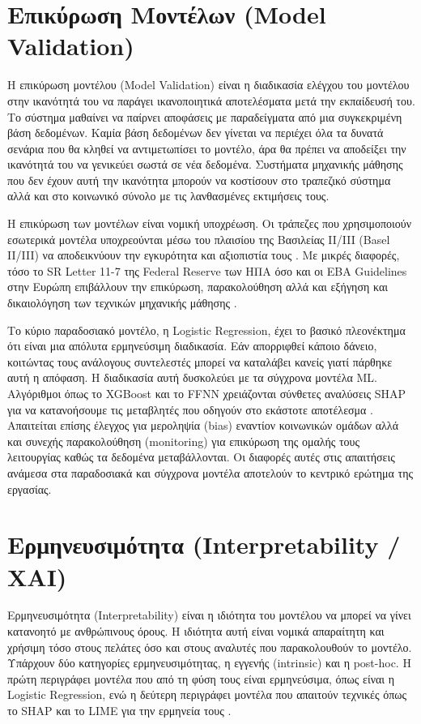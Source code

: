 \section{Επικύρωση Μοντέλων (Model Validation)}
\label{sec:model_validation}

Η επικύρωση μοντέλου (Model Validation) είναι η διαδικασία ελέγχου
του μοντέλου στην ικανότητά του να παράγει ικανοποιητικά αποτελέσματα
μετά την εκπαίδευσή του. Το σύστημα μαθαίνει να παίρνει αποφάσεις με
παραδείγματα από μια συγκεκριμένη βάση δεδομένων. Καμία βάση δεδομένων
δεν γίνεται να περιέχει όλα τα δυνατά σενάρια που θα κληθεί να
αντιμετωπίσει το μοντέλο, άρα θα πρέπει να αποδείξει την ικανότητά
του να γενικεύει σωστά σε νέα δεδομένα. Συστήματα μηχανικής μάθησης
που δεν έχουν αυτή την ικανότητα μπορούν να κοστίσουν στο τραπεζικό
σύστημα αλλά και στο κοινωνικό σύνολο με τις λανθασμένες εκτιμήσεις
τους.

Η επικύρωση των μοντέλων είναι νομική υποχρέωση. Οι τράπεζες που
χρησιμοποιούν εσωτερικά μοντέλα υποχρεούνται μέσω του πλαισίου της
Βασιλείας II/III (Basel II/III) να αποδεικνύουν την εγκυρότητα και
αξιοπιστία τους \citep{basel2006, basel2017}. Με μικρές διαφορές,
τόσο το SR Letter 11-7 της Federal Reserve των ΗΠΑ όσο και οι EBA
Guidelines στην Ευρώπη επιβάλλουν την επικύρωση, παρακολούθηση αλλά
και εξήγηση και δικαιολόγηση των τεχνικών μηχανικής μάθησης
\citep{sr117, eba2023}.

Το κύριο παραδοσιακό μοντέλο, η Logistic Regression, έχει το βασικό
πλεονέκτημα ότι είναι μια απόλυτα ερμηνεύσιμη διαδικασία. Εάν
απορριφθεί κάποιο δάνειο, κοιτώντας τους ανάλογους συντελεστές
μπορεί να καταλάβει κανείς γιατί πάρθηκε αυτή η απόφαση. Η διαδικασία
αυτή δυσκολεύει με τα σύγχρονα μοντέλα ML. Αλγόριθμοι όπως το XGBoost
και το FFNN χρειάζονται σύνθετες αναλύσεις SHAP για να κατανοήσουμε
τις μεταβλητές που οδηγούν στο εκάστοτε αποτέλεσμα \citep{lundberg2017shap}.
Απαιτείται επίσης έλεγχος για μεροληψία (bias) εναντίον κοινωνικών
ομάδων αλλά και συνεχής παρακολούθηση (monitoring) για επικύρωση της
ομαλής τους λειτουργίας καθώς τα δεδομένα μεταβάλλονται. Οι διαφορές
αυτές στις απαιτήσεις ανάμεσα στα παραδοσιακά και σύγχρονα μοντέλα
αποτελούν το κεντρικό ερώτημα της εργασίας.

\section{Ερμηνευσιμότητα (Interpretability / XAI)}
\label{sec:interpretability}
Ερμηνευσιμότητα (Interpretability) είναι η ιδιότητα του μοντέλου να
μπορεί να γίνει κατανοητό με ανθρώπινους όρους. Η ιδιότητα αυτή είναι
νομικά απαραίτητη και χρήσιμη τόσο στους πελάτες όσο και στους
αναλυτές που παρακολουθούν το μοντέλο. Υπάρχουν δύο κατηγορίες
ερμηνευσιμότητας, η εγγενής (intrinsic) και η post-hoc. Η πρώτη
περιγράφει μοντέλα που από τη φύση τους είναι ερμηνεύσιμα, όπως είναι
η Logistic Regression, ενώ η δεύτερη περιγράφει μοντέλα που απαιτούν
τεχνικές όπως το SHAP και το LIME για την ερμηνεία τους
\citep{molnar2022}.

